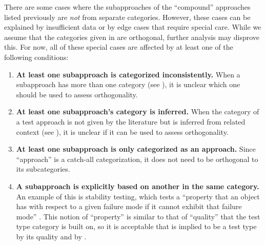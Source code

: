 
There are some cases where the subapproaches of the ``compound'' approaches
listed previously are \emph{not} from separate categories. However, these cases
can be explained by insufficient data or by edge cases that require special care.
While we assume that the categories given in  are
orthogonal, further analysis may disprove this. For now, all of these special
cases are affected by at least one of the following conditions:
\begin{enumerate}
    \item \textbf{At least one subapproach is categorized inconsistently.}
          When a subapproach has more than one category (see ),
          it is unclear which one should be used to assess orthogonality.
    \item \textbf{At least one subapproach's category is inferred.} When the category
          of a test approach is not given by the literature but is inferred
          from related context (see ), it is unclear if it can
          be used to assess orthogonality.
    \item \textbf{At least one subapproach is only categorized as an approach.}
          Since ``approach'' is a catch-all categorization, it does not
          need to be orthogonal to its subcategories.
    \item \textbf{A subapproach is explicitly based on another in the same
              category.} An example of this is stability testing, which
          tests a ``property that an object has with respect to a given
          failure mode if it cannot exhibit that failure mode''
          \citep[p.~434]{IEEE2017}. This notion of
          ``property'' is similar to that of ``quality'' that the test type
          category is built on, so it is acceptable that is implied to be
          a test type by its quality \citep[p.~434]{IEEE2017}%
           and by \citet[p.~55]{Firesmith2015}.
\end{enumerate}